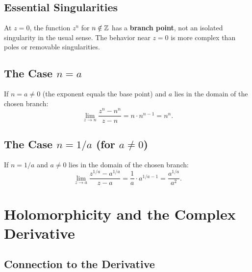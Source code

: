\subsection{Essential Singularities}

\begin{warning}
At $z = 0$, the function $z^n$ for $n \notin \mathbb{Z}$ has a \textbf{branch point}, not an isolated singularity in the usual sense. The behavior near $z = 0$ is more complex than poles or removable singularities.
\end{warning}

\subsection{The Case $n = a$}

\begin{proposition}
If $n = a \neq 0$ (the exponent equals the base point) and $a$ lies in the domain of the chosen branch:
\begin{equation}
\lim_{z \to n} \frac{z^n - n^n}{z - n} = n \cdot n^{n-1} = n^n.
\end{equation}
\end{proposition}

\subsection{The Case $n = 1/a$ (for $a \neq 0$)}

\begin{proposition}
If $n = 1/a$ and $a \neq 0$ lies in the domain of the chosen branch:
\begin{equation}
\lim_{z \to a} \frac{z^{1/a} - a^{1/a}}{z - a} = \frac{1}{a} \cdot a^{1/a - 1} = \frac{a^{1/a}}{a^2}.
\end{equation}
\end{proposition}

\section{Holomorphicity and the Complex Derivative}

\subsection{Connection to the Derivative}

